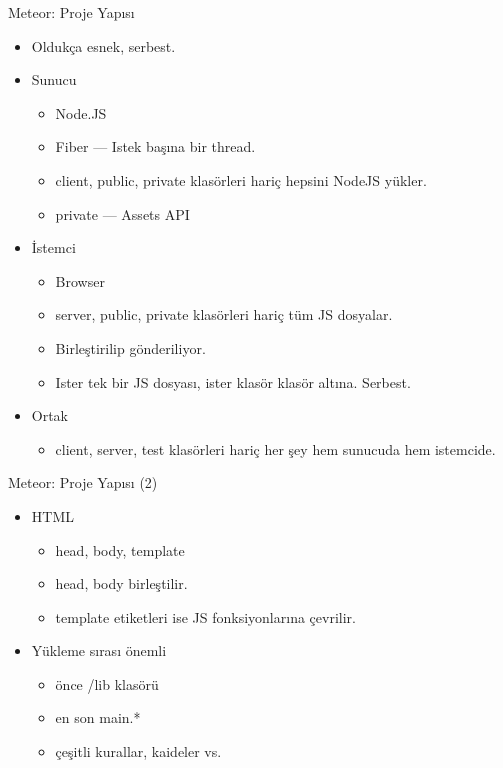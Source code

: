 \documentclass{beamer}
\begin{document}
    \begin{frame}{Meteor: Proje Yapısı}
        \begin{itemize}
            \item Oldukça esnek, serbest.
            \item Sunucu
                \begin{itemize}
                    \item Node.JS
                    \item Fiber --- Istek başına bir thread.
                    \item client, public, private klasörleri hariç hepsini NodeJS yükler.
                    \item private --- Assets API
                \end{itemize}
            \item İstemci
                \begin{itemize}
                    \item Browser
                    \item server, public, private klasörleri hariç tüm JS dosyalar.
                    \item Birleştirilip gönderiliyor.
                    \item Ister tek bir JS dosyası, ister klasör klasör altına. Serbest.
                \end{itemize}
            \item Ortak
                \begin{itemize}
                    \item client, server, test klasörleri hariç her şey hem sunucuda hem istemcide.
                \end{itemize}
        \end{itemize}
    \end{frame}

    \begin{frame}{Meteor: Proje Yapısı (2)}
        \begin{itemize}
            \item HTML
                \begin{itemize}
                    \item head, body, template
                    \item head, body birleştilir.
                    \item template etiketleri ise JS fonksiyonlarına çevrilir.
                \end{itemize}
            \item Yükleme sırası önemli
                \begin{itemize}
                    \item önce /lib klasörü
                    \item en son main.*
                    \item çeşitli kurallar, kaideler vs.
                \end{itemize}
        \end{itemize}
    \end{frame}
\end{document}
